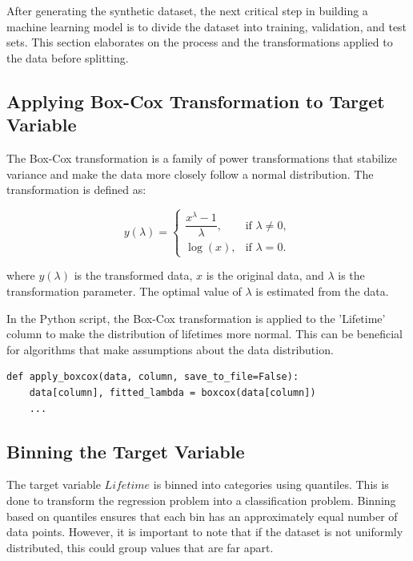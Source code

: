 After generating the synthetic dataset, the next critical step in building a machine learning model is to divide the dataset into training, validation, and test sets. This section elaborates on the process and the transformations applied to the data before splitting.

\subsection*{Applying Box-Cox Transformation to Target Variable}

The Box-Cox transformation is a family of power transformations that stabilize variance and make the data more closely follow a normal distribution. The transformation is defined as:

\begin{equation}
y(\lambda) =
\begin{cases}
\dfrac{x^\lambda - 1}{\lambda}, & \text{if }\lambda \neq 0,\\
\log(x), & \text{if }\lambda = 0.
\end{cases}
\end{equation}

where \(y(\lambda)\) is the transformed data, \(x\) is the original data, and \(\lambda\) is the transformation parameter. The optimal value of \(\lambda\) is estimated from the data.

In the Python script, the Box-Cox transformation is applied to the 'Lifetime' column to make the distribution of lifetimes more normal. This can be beneficial for algorithms that make assumptions about the data distribution.

\begin{verbatim}
def apply_boxcox(data, column, save_to_file=False):
    data[column], fitted_lambda = boxcox(data[column])
    ...
\end{verbatim}

\subsection*{Binning the Target Variable}

The target variable \(Lifetime\) is binned into categories using quantiles. This is done to transform the regression problem into a classification problem. Binning based on quantiles ensures that each bin has an approximately equal number of data points. However, it is important to note that if the dataset is not uniformly distributed, this could group values that are far apart.

